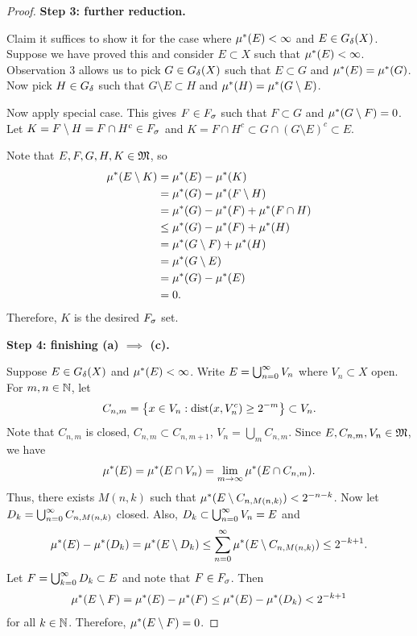 \documentclass[a4paper]{article}
\begin{document}
\begin{proof}
\textbf{Step 3: further reduction.}

Claim it suffices to show it for the case where $\mu^*(E) < \infty$
and $E \in G_\delta(X)$. Suppose we have proved this and consider
$E \subset X$ such that $\mu^*(E) < \infty$. Observation 3
allows us to pick $G \in G_\delta(X)$ such that $E \subset G$
and $\mu^*(E) = \mu^*(G)$. Now pick $H \in G_\delta$ such that $G \setminus E \subset H$
and $\mu^*(H) = \mu^*(G \setminus E)$.

Now apply special case. This gives $F \in F_\sigma$ such that
$F \subset G$ and $\mu^*(G \setminus F) = 0$. Let $K = F \setminus H
= F \cap H^c \in F_\sigma$ and $K = F \cap H^c \subset
G \cap (G \setminus E)^c \subset E$.

Note that $E, F, G, H, K \in \mathfrak{M}$, so
\[
\begin{aligned}
\mu^*(E \setminus K)
&= \mu^*(E) - \mu^*(K) \\
&= \mu^*(G) - \mu^*(F \setminus H) \\
&= \mu^*(G) - \mu^*(F) + \mu^*(F \cap H) \\
&\leq \mu^*(G) - \mu^*(F) + \mu^*(H) \\
&= \mu^*(G \setminus F) + \mu^*(H)  \\
&= \mu^*(G \setminus E) \\
&= \mu^*(G) - \mu^*(E) \\
&= 0.
\end{aligned}
\]
Therefore, $K$ is the desired $F_\sigma$ set.

\textbf{Step 4: finishing (a) $\implies$ (c). }

Suppose $E \in G_\delta(X)$ and $\mu^*(E) < \infty$.
Write $E = \bigcup_{n=0}^\infty V_n$ where $V_n \subset X$ open.
For $m, n \in \mathbb{N}$, let
\[
C_{n, m} = \left\{ x \in V_n: \operatorname{dist}(x, V_n^c) \geq 2^{-m} \right\}
\subset V_n.
\]
Note that $C_{n, m}$ is closed, $C_{n, m} \subset C_{n, m+1}$,
$V_n = \bigcup_{m} C_{n, m}$. Since $E, C_{n, m}, V_n \in \mathfrak{M}$,
we have
\[
\mu^*(E) = \mu^*(E \cap V_n) = \lim_{m \to \infty} \mu^*(E
\cap C_{n, m}).
\]
Thus, there exists $M(n, k)$ such that
$\mu^*(E \setminus C_{n, M(n, k)}) < 2^{-n-k}$.
Now let $D_k = \bigcup_{n=0}^\infty C_{n, M(n, k)}$ closed.
Also, $D_k \subset \bigcup_{n=0}^\infty V_n = E$ and
\[
\mu^*(E) - \mu^*(D_k) = \mu^*(E \setminus D_k)
\leq \sum_{n=0}^\infty \mu^*(E \setminus C_{n, M(n, k)}) \leq 2^{-k+1}.
\]
Let $F = \bigcup_{k=0}^\infty D_k \subset E$ and note that $F \in F_\sigma$.
Then
\[
\mu^*(E \setminus F) = \mu^*(E) - \mu^*(F)
\leq \mu^*(E) - \mu^*(D_k) < 2^{-k+1}
\]
for all $k \in \mathbb{N}$. Therefore, $\mu^*(E \setminus F) = 0$.


\end{proof}
\end{document}
